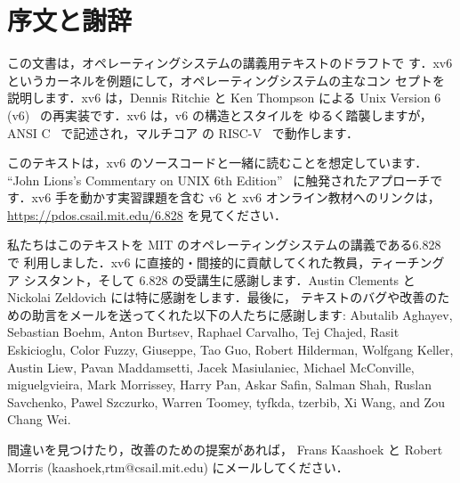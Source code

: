 \chapter*{序文と謝辞}

この文書は，オペレーティングシステムの講義用テキストのドラフトで
す．xv6 というカーネルを例題にして，オペレーティングシステムの主なコン
セプトを説明します．xv6 は，Dennis Ritchie と Ken Thompson による Unix
Version 6 (v6)~\cite{unix} の再実装です．xv6 は，v6 の構造とスタイルを
ゆるく踏襲しますが，ANSI C~\cite{kernighan} で記述され，マルチコア
の RISC-V~\cite{riscv} で動作します．

このテキストは，xv6 のソースコードと一緒に読むことを想定しています．
``John Lions's Commentary on UNIX 6th Edition''~\cite{lions} 
に触発されたアプローチです．xv6 手を動かす実習課題を含む
v6 と xv6 オンライン教材へのリンクは，
\url{https://pdos.csail.mit.edu/6.828}
を見てください．

私たちはこのテキストを MIT のオペレーティングシステムの講義である6.828 で
利用しました．xv6 に直接的・間接的に貢献してくれた教員，ティーチングア
シスタント，そして 6.828 の受講生に感謝します．Austin
Clements と Nickolai Zeldovich には特に感謝をします．最後に，
テキストのバグや改善のための助言をメールを送ってくれた以下の人たちに感謝します: 
%
Abutalib Aghayev, Sebastian Boehm, Anton Burtsev, Raphael Carvalho,
Tej Chajed, Rasit Eskicioglu, Color Fuzzy, Giuseppe, Tao Guo, Robert
Hilderman, Wolfgang Keller, Austin Liew, Pavan Maddamsetti, Jacek
Masiulaniec, Michael McConville, miguelgvieira, Mark Morrissey, Harry
Pan, Askar Safin, Salman Shah, Ruslan Savchenko, Pawel Szczurko,
Warren Toomey, tyfkda, tzerbib, Xi Wang, and Zou Chang Wei.

間違いを見つけたり，改善のための提案があれば，
Frans Kaashoek と Robert Morris (kaashoek,rtm@csail.mit.edu)
にメールしてください．

